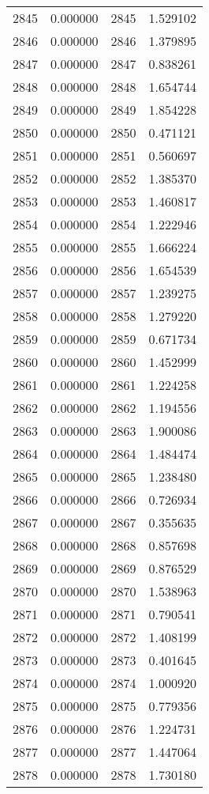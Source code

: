 \documentclass[12pt]{article}
\begin{document}
\begin{longtable}{@{}cccc@{}}
2845 & 0.000000 & 2845 & 1.529102 \\
2846 & 0.000000 & 2846 & 1.379895 \\
2847 & 0.000000 & 2847 & 0.838261 \\
2848 & 0.000000 & 2848 & 1.654744 \\
2849 & 0.000000 & 2849 & 1.854228 \\
2850 & 0.000000 & 2850 & 0.471121 \\
2851 & 0.000000 & 2851 & 0.560697 \\
2852 & 0.000000 & 2852 & 1.385370 \\
2853 & 0.000000 & 2853 & 1.460817 \\
2854 & 0.000000 & 2854 & 1.222946 \\
2855 & 0.000000 & 2855 & 1.666224 \\
2856 & 0.000000 & 2856 & 1.654539 \\
2857 & 0.000000 & 2857 & 1.239275 \\
2858 & 0.000000 & 2858 & 1.279220 \\
2859 & 0.000000 & 2859 & 0.671734 \\
2860 & 0.000000 & 2860 & 1.452999 \\
2861 & 0.000000 & 2861 & 1.224258 \\
2862 & 0.000000 & 2862 & 1.194556 \\
2863 & 0.000000 & 2863 & 1.900086 \\
2864 & 0.000000 & 2864 & 1.484474 \\
2865 & 0.000000 & 2865 & 1.238480 \\
2866 & 0.000000 & 2866 & 0.726934 \\
2867 & 0.000000 & 2867 & 0.355635 \\
2868 & 0.000000 & 2868 & 0.857698 \\
2869 & 0.000000 & 2869 & 0.876529 \\
2870 & 0.000000 & 2870 & 1.538963 \\
2871 & 0.000000 & 2871 & 0.790541 \\
2872 & 0.000000 & 2872 & 1.408199 \\
2873 & 0.000000 & 2873 & 0.401645 \\
2874 & 0.000000 & 2874 & 1.000920 \\
2875 & 0.000000 & 2875 & 0.779356 \\
2876 & 0.000000 & 2876 & 1.224731 \\
2877 & 0.000000 & 2877 & 1.447064 \\
2878 & 0.000000 & 2878 & 1.730180 \\

\end{longtable}
\end{document}
